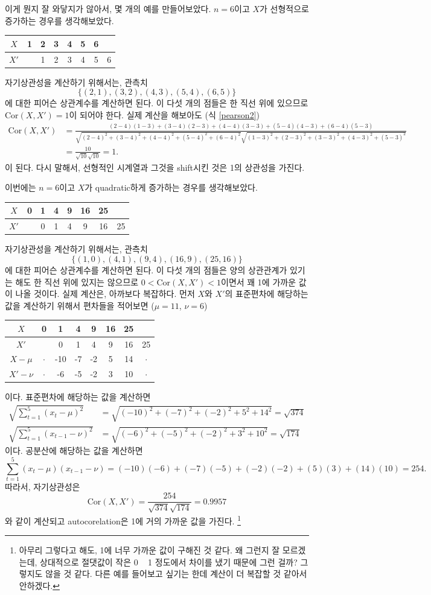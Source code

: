 \documentclass{article}
\begin{document}
이게 뭔지 잘 와닿지가 않아서, 몇 개의 예를 만들어보았다.
\(n=6\)이고 \(X\)가 선형적으로 증가하는 경우를 생각해보았다.
\begin{center}
\begin{tabular}{c|ccccccc}
$X$ &1&2&3&4&5&6&\\\hline
$X'$& &1&2&3&4&5&6
\end{tabular}
\end{center}
자기상관성을 계산하기 위해서는, 관측치
\[\{(2,1),(3,2),(4,3),(5,4),(6,5)\}\]
에 대한 피어슨 상관계수를 계산하면 된다.
이 다섯 개의 점들은 한 직선 위에 있으므로 \(\text{Cor}(X,X')=1\)이 되어야 한다.
실제 계산을 해보아도 (식 \eqref{pearson2})
\begin{align*}
\text{Cor}(X,X')
&=\frac{(2-4)(1-3)+(3-4)(2-3)+(4-4)(3-3)+(5-4)(4-3)+(6-4)(5-3)}{\sqrt{(2-4)^2+(3-4)^2+(4-4)^2+(5-4)^2+(6-4)^2}\sqrt{(1-3)^2+(2-3)^2+(3-3)^2+(4-3)^2+(5-3)^2}}\\
&=\frac{10}{\sqrt{10}\sqrt{10}}=1.
\end{align*}
이 된다.
다시 말해서, 선형적인 시계열과 그것을 shift시킨 것은 1의 상관성을 가진다.

이번에는 $n=6$이고 $X$가 quadratic하게 증가하는 경우를 생각해보았다.
\begin{center}
\begin{tabular}{c|ccccccc}
$X$ &0&1&4&9&16&25&\\\hline
$X'$& &0&1&4&9&16&25
\end{tabular}
\end{center}
자기상관성을 계산하기 위해서는, 관측치
\[\{(1,0),(4,1),(9,4),(16,9),(25,16)\}\]
에 대한 피어슨 상관계수를 계산하면 된다.
이 다섯 개의 점들은 양의 상관관계가 있기는 해도 한 직선 위에 있지는 않으므로 \(0<\text{Cor}(X,X')<1\)이면서 꽤 1에 가까운 값이 나올 것이다.
실제 계산은, 아까보다 복잡하다.
먼저 $X$와 $X'$의 표준편차에 해당하는 값을 계산하기 위해서 편차들을 적어보면 (\(\mu=11\), \(\nu=6\))
\begin{center}
\begin{tabular}{c|ccccccc}
$X$ &0&1&4&9&16&25&\\\hline
$X'$& &0&1&4&9&16&25\\\hline
$X-\mu$&$\cdot$&-10&-7&-2&5&14&$\cdot$\\\hline
$X'-\nu$&$\cdot$&-6&-5&-2&3&10&$\cdot$
\end{tabular}
\end{center}
이다.
표준편차에 해당하는 값을 계산하면
\begin{align*}
\sqrt{\sum_{t=1}^5(x_t-\mu)^2}
&=\sqrt{(-10)^2+(-7)^2+(-2)^2+5^2+14^2}=\sqrt{374}\\
\sqrt{\sum_{t=1}^5(x_{t-1}-\nu)^2}
&=\sqrt{(-6)^2+(-5)^2+(-2)^2+3^2+10^2}=\sqrt{174}
\end{align*}
이다. 공분산에 해당하는 값을 계산하면
\[\sum_{t=1}^5(x_t-\mu)(x_{t-1}-\nu)=(-10)(-6)+(-7)(-5)+(-2)(-2)+(5)(3)+(14)(10)=254.\]
따라서, 자기상관성은
\[\text{Cor}(X,X')=\frac{254}{\sqrt{374}\sqrt{174}}=0.9957\]
와 같이 계산되고 autocorelation은 1에 거의 가까운 값을 가진다.
\footnote{아무리 그렇다고 해도, 1에 너무 가까운 값이 구해진 것 같다.
왜 그런지 잘 모르겠는데, 상대적으로 절댓값이 작은 0 ~ 1 정도에서 차이를 냈기 때문에 그런 걸까? 그렇지도 않을 것 같다.
다른 예를 들어보고 싶기는 한데 계산이 더 복잡할 것 같아서 안하겠다.}
\end{document}
